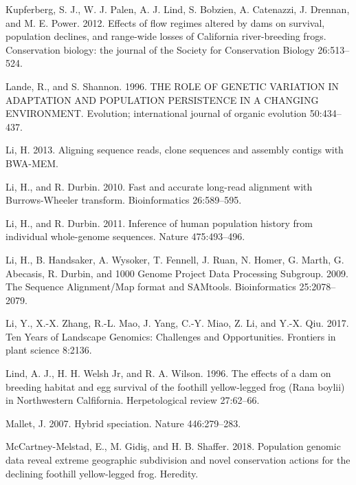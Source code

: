 \documentclass[twoside,12pt,final]{ucthesis-CA2012} %
\begin{document}
\begin{ucmainmatter}
\leavevmode\hypertarget{ref-kupferberg_effects_2012}{}%
Kupferberg, S. J., W. J. Palen, A. J. Lind, S. Bobzien, A. Catenazzi, J.
Drennan, and M. E. Power. 2012. Effects of flow regimes altered by dams
on survival, population declines, and range-wide losses of California
river-breeding frogs. Conservation biology: the journal of the Society
for Conservation Biology 26:513--524.

\leavevmode\hypertarget{ref-lande_role_1996}{}%
Lande, R., and S. Shannon. 1996. THE ROLE OF GENETIC VARIATION IN
ADAPTATION AND POPULATION PERSISTENCE IN A CHANGING ENVIRONMENT.
Evolution; international journal of organic evolution 50:434--437.

\leavevmode\hypertarget{ref-li_aligning_2013}{}%
Li, H. 2013. Aligning sequence reads, clone sequences and assembly
contigs with BWA-MEM.

\leavevmode\hypertarget{ref-li_fast_2010}{}%
Li, H., and R. Durbin. 2010. Fast and accurate long-read alignment with
Burrows-Wheeler transform. Bioinformatics 26:589--595.

\leavevmode\hypertarget{ref-li_inference_2011}{}%
Li, H., and R. Durbin. 2011. Inference of human population history from
individual whole-genome sequences. Nature 475:493--496.

\leavevmode\hypertarget{ref-li_sequence_2009}{}%
Li, H., B. Handsaker, A. Wysoker, T. Fennell, J. Ruan, N. Homer, G.
Marth, G. Abecasis, R. Durbin, and 1000 Genome Project Data Processing
Subgroup. 2009. The Sequence Alignment/Map format and SAMtools.
Bioinformatics 25:2078--2079.

\leavevmode\hypertarget{ref-li_ten_2017}{}%
Li, Y., X.-X. Zhang, R.-L. Mao, J. Yang, C.-Y. Miao, Z. Li, and Y.-X.
Qiu. 2017. Ten Years of Landscape Genomics: Challenges and
Opportunities. Frontiers in plant science 8:2136.

\leavevmode\hypertarget{ref-lind_effects_1996}{}%
Lind, A. J., H. H. Welsh Jr, and R. A. Wilson. 1996. The effects of a
dam on breeding habitat and egg survival of the foothill yellow-legged
frog (Rana boylii) in Northwestern Calfifornia. Herpetological review
27:62--66.

\leavevmode\hypertarget{ref-mallet_hybrid_2007}{}%
Mallet, J. 2007. Hybrid speciation. Nature 446:279--283.

\leavevmode\hypertarget{ref-mccartney-melstad_population_2018}{}%
McCartney-Melstad, E., M. Gidiş, and H. B. Shaffer. 2018. Population
genomic data reveal extreme geographic subdivision and novel
conservation actions for the declining foothill yellow-legged frog.
Heredity.


\end{ucmainmatter}
\end{document}
